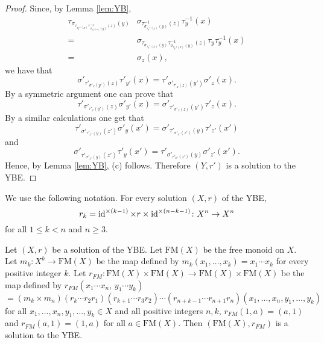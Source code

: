 \begin{proof}
Since, by Lemma \ref{lem:YB},
\begin{align*}
\tau_{\sigma_{\tau_{\tau^{-1}_y(x)}\tau^{-1}_{\sigma_{\tau^{-1}_y(x)}(y)}(z)}(y)}&\sigma_{\tau^{-1}_{\sigma_{\tau^{-1}_y(x)}(y)}(z)}\tau^{-1}_y(x)\\
=&\sigma_{\tau_{\sigma_{\tau^{-1}_y(x)}(y)}\tau^{-1}_{\sigma_{\tau^{-1}_y(x)}(y)}(z)} \tau_y{\tau^{-1}_y}(x)\\
=&\sigma_z(x), 
\end{align*}
we have that
\[\sigma'_{\tau'_{\sigma'_x(y')}(z)}\tau'_{y'}(x)=\tau'_{\sigma'_{\tau'_x(z)}(y')}\sigma'_{z}(x).\]
By a symmetric argument one can prove that
\[\tau'_{\sigma'_{\tau'_x(y')}(z)}\sigma'_{y'}(x)=\sigma'_{\tau'_{\sigma'_x(z)}(y')}\tau'_{z}(x).\]
By a similar calculations one get that
\[\tau'_{\sigma'_{\tau'_{x'}(y)}(z')}\sigma'_{y}(x')=\sigma'_{\tau'_{\sigma'_{x'}(z')}(y)}\tau'_{z'}(x')\]
and
\[\sigma'_{\tau'_{\sigma'_{x'}(y)}(z')}\tau'_{y}(x')=\tau'_{\sigma'_{\tau'_{x'}(z')}(y)}\sigma'_{z'}(x').\]
Hence, by Lemma \ref{lem:YB}, (c) follows. Therefore $(Y,r')$ is a solution to the YBE.
\end{proof}

We use the following notation. For every solution $(X,r)$ of the YBE,
\[r_k=\operatorname{id}^{\times (k-1)}\times r\times\operatorname{id}^{\times (n-k-1)}\colon X^{n}\rightarrow X^n\]
for all $1\leq k<n$ and $n\geq 3$.
\begin{theorem}
\label{thm:solfreemonoid}
Let $(X,r)$ be a solution of the YBE. Let $\mathrm{FM}(X)$ be the free monoid on $X$. Let $m_k\colon X^{k}\rightarrow \mathrm{FM}(X)$ be the map defined by $m_k(x_1,\dots ,x_k)=x_1\cdots x_k$ for every positive integer $k$. Let $r_{FM}\colon \mathrm{FM}(X)\times \mathrm{FM}(X)\rightarrow \mathrm{FM}(X)\times \mathrm{FM}(X)$ be the map defined by $r_{FM}(x_1\cdots x_n,\, y_1\cdots y_k)$
\[=(m_k\times m_n)(r_k\cdots r_2r_1)(r_{k+1}\cdots r_3r_2)\cdots(r_{n+k-1}\cdots r_{n+1}r_n)(x_1,\dots ,x_n,y_1,\dots ,y_k)\]
for all $x_1,\dots ,x_n,y_1,\dots ,y_k\in X$ and all positive integers $n,k$,   $r_{FM}(1,a)=(a,1)$ and $r_{FM}(a,1)=(1,a)$ for all $a\in \mathrm{FM}(X)$. Then $(\mathrm{FM}(X),r_{FM})$ is a solution to the YBE.
\end{theorem}


